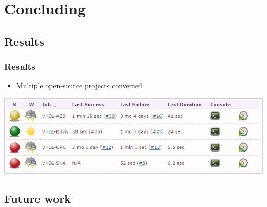 \documentclass[british,10pt]{beamer}
\begin{document}

\section{Concluding}

\subsection{Results}
\begin{frame}\frametitle{Results}
\begin{itemize}
\item Multiple open-source projects converted
\end{itemize}
\medskip
{\centering
\includegraphics[width=\textwidth]{images/jobs.png}}
\end{frame}


%

\subsection{Future work}
\end{document}
